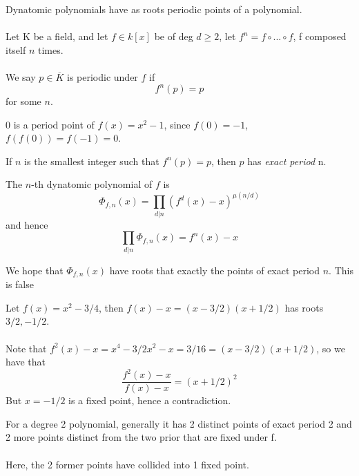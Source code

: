 \begin{definition}
Dynatomic polynomials have as roots periodic points of a polynomial.\\\\
Let K be a field, and let $f \in k[x]$ be of deg $d \geq 2$, let $f^n = f \circ ... \circ f$, f composed itself $n$ times.\\\\
We say $p \in \overline{K}$ is periodic under $f$ if
\[f^n(p) = p\]
for some $n$.
\end{definition}

\begin{example}
0 is a period point of $f(x) = x^2 - 1$, since $f(0) = -1$, $f(f(0)) = f(-1) = 0$.
\end{example}

\begin{definition}
If $n$ is the smallest integer such that $f^n(p) = p$, then $p$ has \textit{exact period} n.
\end{definition}

\begin{definition}
The $n$-th dynatomic polynomial of $f$ is
\[\Phi_{f, n}(x) = \prod_{d | n} (f^d(x) - x)^{\mu(n/d)}\]
and hence
\[\prod_{d | n} \Phi_{f, n}(x) = f^n(x) - x\]
\end{definition}

\noindent We hope that $\Phi_{f, n}(x)$ have roots that exactly the points of exact period $n$. This is false

\begin{example}
Let $f(x) = x^2 - 3/4$, then $f(x) - x = (x - 3/2)(x + 1/2)$ has roots $3/2, -1/2$.\\\\
Note that $f^2(x) - x = x^4 - 3/2x^2 - x = 3/16 = (x - 3/2)(x + 1/2)$, so we have that
\[\frac{f^2(x) - x}{f(x) - x} = (x + 1/2)^2\]
But $x = -1/2$ is a fixed point, hence a contradiction.
\end{example}

\begin{remark}
For a degree 2 polynomial, generally it has 2 distinct points of exact period 2 and 2 more points distinct from the two prior that are fixed under f.\\\\
Here, the 2 former points have collided into 1 fixed point.
\end{remark}